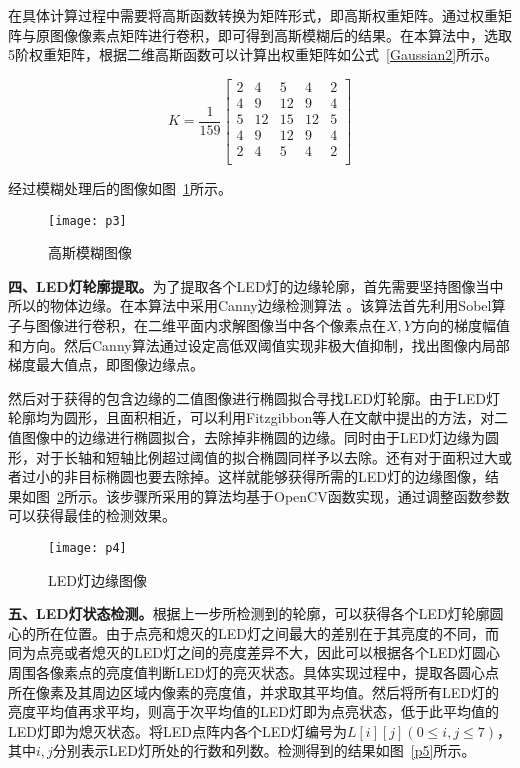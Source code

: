 在具体计算过程中需要将高斯函数转换为矩阵形式，即高斯权重矩阵。通过权重矩阵与原图像像素点矩阵进行卷积，即可得到高斯模糊后的结果。在本算法中，选取5阶权重矩阵，根据二维高斯函数可以计算出权重矩阵如公式~\ref{Gaussian2}所示。

\begin{equation}
K = \frac{1}{159}\left[
\begin{matrix}
2&4&5&4&2 \\
4&9&12&9&4 \\
5&12&15&12&5\\
4&9&12&9&4 \\
2&4&5&4&2 \\
\end{matrix}
\right]
  \label{Gaussian2}
\end{equation}

经过模糊处理后的图像如图~\ref{p3}所示。

\begin{figure}[H] 
  \centering
  \texttt{[image: p3]}
  \caption{高斯模糊图像}
  \label{p3}
\end{figure}

\textbf{四、LED灯轮廓提取。}为了提取各个LED灯的边缘轮廓，首先需要坚持图像当中所以的物体边缘。在本算法中采用Canny边缘检测算法 \cite{canny1986computational}。该算法首先利用Sobel算子与图像进行卷积，在二维平面内求解图像当中各个像素点在$X, Y$方向的梯度幅值和方向。然后Canny算法通过设定高低双阈值实现非极大值抑制，找出图像内局部梯度最大值点，即图像边缘点。

然后对于获得的包含边缘的二值图像进行椭圆拟合寻找LED灯轮廓。由于LED灯轮廓均为圆形，且面积相近，可以利用Fitzgibbon等人在文献\cite{fitzgibbon1996buyer}中提出的方法，对二值图像中的边缘进行椭圆拟合，去除掉非椭圆的边缘。同时由于LED灯边缘为圆形，对于长轴和短轴比例超过阈值的拟合椭圆同样予以去除。还有对于面积过大或者过小的非目标椭圆也要去除掉。这样就能够获得所需的LED灯的边缘图像，结果如图~\ref{p4}所示。该步骤所采用的算法均基于OpenCV函数实现，通过调整函数参数可以获得最佳的检测效果。

\begin{figure}[H] 
  \centering
  \texttt{[image: p4]}
  \caption{LED灯边缘图像}
  \label{p4}
\end{figure}

\textbf{五、LED灯状态检测。}根据上一步所检测到的轮廓，可以获得各个LED灯轮廓圆心的所在位置。由于点亮和熄灭的LED灯之间最大的差别在于其亮度的不同，而同为点亮或者熄灭的LED灯之间的亮度差异不大，因此可以根据各个LED灯圆心周围各像素点的亮度值判断LED灯的亮灭状态。具体实现过程中，提取各圆心点所在像素及其周边区域内像素的亮度值，并求取其平均值。然后将所有LED灯的亮度平均值再求平均，则高于次平均值的LED灯即为点亮状态，低于此平均值的LED灯即为熄灭状态。将LED点阵内各个LED灯编号为$L[i][j] (0 \le i, j \le 7)$，其中$i, j$分别表示LED灯所处的行数和列数。检测得到的结果如图~\ref{p5}所示。
 
